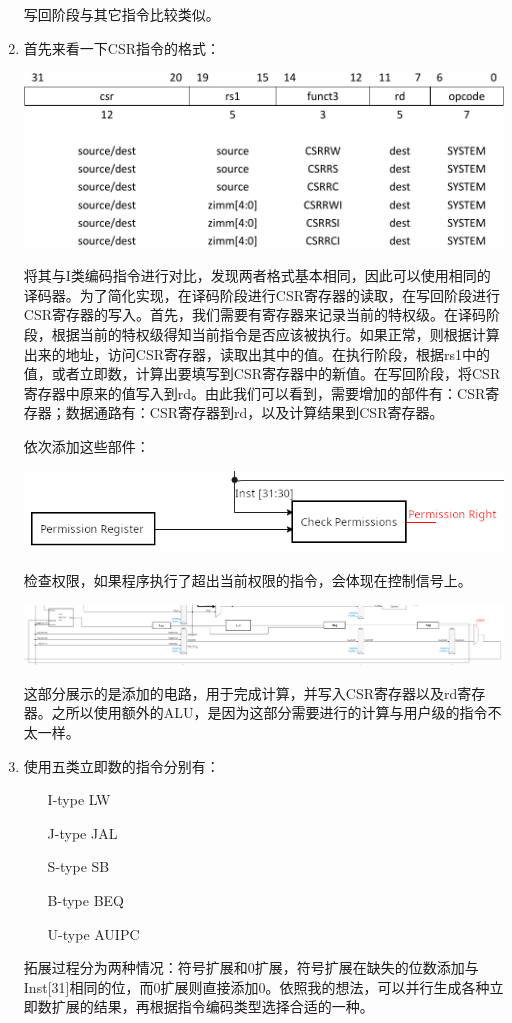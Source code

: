 \documentclass[UTF8,zihao=-4]{ctexart}
\begin{document}
\begin{enumerate}
		写回阶段与其它指令比较类似。
		\item 首先来看一下CSR指令的格式：
		\begin{center}
		\includegraphics[width=0.8\linewidth]{csr}
		\end{center}
		将其与I类编码指令进行对比，发现两者格式基本相同，因此可以使用相同的译码器。为了简化实现，在译码阶段进行CSR寄存器的读取，在写回阶段进行CSR寄存器的写入。首先，我们需要有寄存器来记录当前的特权级。在译码阶段，根据当前的特权级得知当前指令是否应该被执行。如果正常，则根据计算出来的地址，访问CSR寄存器，读取出其中的值。在执行阶段，根据rs1中的值，或者立即数，计算出要填写到CSR寄存器中的新值。在写回阶段，将CSR寄存器中原来的值写入到rd。由此我们可以看到，需要增加的部件有：CSR寄存器；数据通路有：CSR寄存器到rd，以及计算结果到CSR寄存器。
		
		依次添加这些部件：
		\begin{center}
		\includegraphics[width=0.8\linewidth]{csr_file_patch}
		\end{center}
		检查权限，如果程序执行了超出当前权限的指令，会体现在控制信号上。
		\begin{center}
		\includegraphics[width=1\linewidth]{csr_full_patch}
		\end{center}
		这部分展示的是添加的电路，用于完成计算，并写入CSR寄存器以及rd寄存器。之所以使用额外的ALU，是因为这部分需要进行的计算与用户级的指令不太一样。
		
		\item 使用五类立即数的指令分别有：
		\begin{enumerate}
		\item[I-type] LW
		\item[J-type] JAL
		\item[S-type] SB
		\item[B-type] BEQ
		\item[U-type] AUIPC
		\end{enumerate}
		拓展过程分为两种情况：符号扩展和0扩展，符号扩展在缺失的位数添加与Inst[31]相同的位，而0扩展则直接添加0。依照我的想法，可以并行生成各种立即数扩展的结果，再根据指令编码类型选择合适的一种。
		

\end{enumerate}
\end{document}
